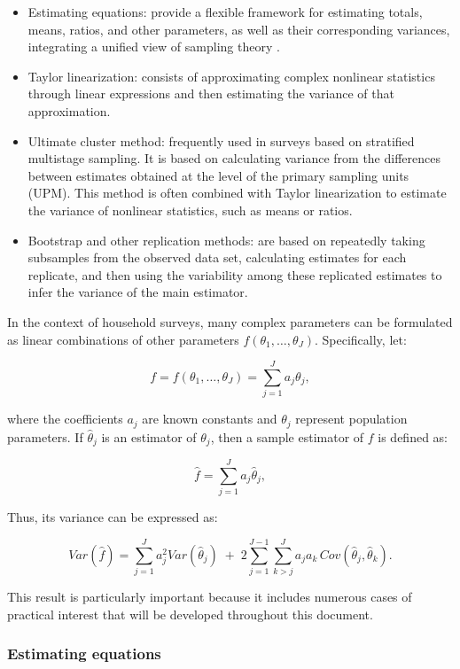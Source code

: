 \documentclass[
  english,
  12pt,
]{book}
\begin{document}
\begin{itemize}
\item
  Estimating equations: provide a flexible framework for estimating totals, means, ratios, and other parameters, as well as their corresponding variances, integrating a unified view of sampling theory \citep{binder1983variances}.
\item
  Taylor linearization: consists of approximating complex nonlinear statistics through linear expressions and then estimating the variance of that approximation.
\item
  Ultimate cluster method: frequently used in surveys based on stratified multistage sampling. It is based on calculating variance from the differences between estimates obtained at the level of the primary sampling units (UPM). This method is often combined with Taylor linearization to estimate the variance of nonlinear statistics, such as means or ratios.
\item
  Bootstrap and other replication methods: are based on repeatedly taking subsamples from the observed data set, calculating estimates for each replicate, and then using the variability among these replicated estimates to infer the variance of the main estimator.
\end{itemize}

In the context of household surveys, many complex parameters can be formulated as linear combinations of other parameters \(f(\theta_1,\ldots,\theta_J)\). Specifically, let:

\[
f=f(\theta_1,\ldots,\theta_J) = \sum_{j=1}^J a_j \theta_j,
\]

where the coefficients \(a_j\) are known constants and \(\theta_j\) represent population parameters. If \(\hat\theta_j\) is an estimator of \(\theta_j\), then a sample estimator of \(f\) is defined as:

\[
\hat{f} = \sum_{j=1}^J a_j \hat{\theta}_j,
\]

Thus, its variance can be expressed as:

\[
Var(\hat{f}) = \sum_{j=1}^J a_j^2 Var(\hat{\theta}_j)
\;+\;
2\sum_{j=1}^{J-1}\sum_{k>j}^J
a_j a_k \, Cov(\hat{\theta}_j,\hat{\theta}_k).
\]

This result is particularly important because it includes numerous cases of practical interest that will be developed throughout this document.

\subsubsection{Estimating equations}\label{ecuaciones-de-estimacion}
\end{document}
